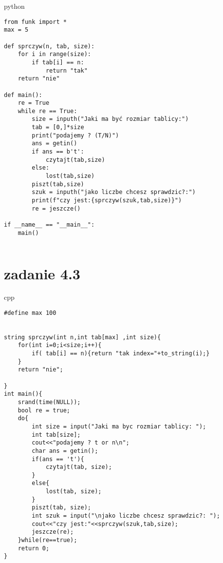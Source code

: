 \documentclass{article}
\begin{document}
\begin{temp}{\large python}  
\begin{verbatim}
from funk import *
max = 5

def sprczyw(n, tab, size):
    for i in range(size):
        if tab[i] == n:
            return "tak"
    return "nie"

def main():
    re = True
    while re == True:
        size = inputh("Jaki ma być rozmiar tablicy:")
        tab = [0,]*size
        print("podajemy ? (T/N)")
        ans = getin()
        if ans == b't':
            czytajt(tab,size)
        else:
            lost(tab,size)
        piszt(tab,size)
        szuk = inputh("jako liczbe chcesz sprawdzic?:")
        print(f"czy jest:{sprczyw(szuk,tab,size)}")
        re = jeszcze()

if __name__ == "__main__":
    main()


\end{verbatim}
\end{temp}

\section*{zadanie 4.3}

\begin{temp}{\large cpp}  
\begin{verbatim}
#define max 100


string sprczyw(int n,int tab[max] ,int size){
    for(int i=0;i<size;i++){
        if( tab[i] == n){return "tak index="+to_string(i);}
    }
    return "nie";

}
int main(){
    srand(time(NULL));
    bool re = true;
    do{
        int size = input("Jaki ma byc rozmiar tablicy: ");        
        int tab[size];
        cout<<"podajemy ? t or n\n";
        char ans = getin();
        if(ans == 't'){
            czytajt(tab, size);
        }
        else{
            lost(tab, size);
        }
        piszt(tab, size);
        int szuk = input("\njako liczbe chcesz sprawdzic?: ");
        cout<<"czy jest:"<<sprczyw(szuk,tab,size);
        jeszcze(re);
    }while(re==true);
    return 0;
}

\end{verbatim}
\end{temp}
\end{document}
